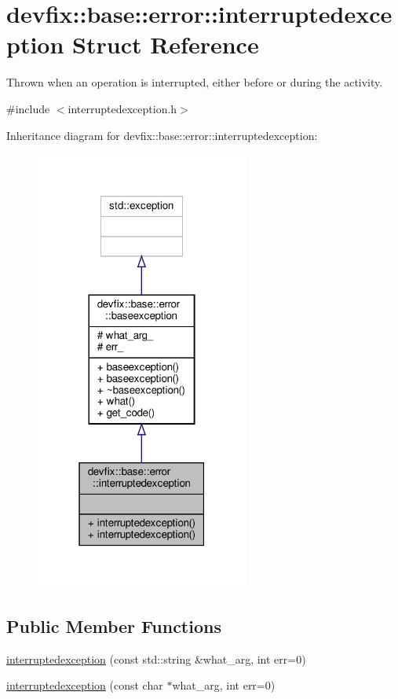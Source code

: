 \hypertarget{structdevfix_1_1base_1_1error_1_1interruptedexception}{}\section{devfix\+:\+:base\+:\+:error\+:\+:interruptedexception Struct Reference}
\label{structdevfix_1_1base_1_1error_1_1interruptedexception}


Thrown when an operation is interrupted, either before or during the activity.  




{\ttfamily \#include $<$interruptedexception.\+h$>$}



Inheritance diagram for devfix\+:\+:base\+:\+:error\+:\+:interruptedexception\+:
\nopagebreak
\begin{figure}[H]
\begin{center}
\leavevmode
\includegraphics[width=199pt]{structdevfix_1_1base_1_1error_1_1interruptedexception__inherit__graph}
\end{center}
\end{figure}
\subsection*{Public Member Functions}
\begin{DoxyCompactItemize}
\item 
\hyperlink{structdevfix_1_1base_1_1error_1_1interruptedexception_ab89281cb08ca7481da32bde8da8e7a00}{interruptedexception} (const std\+::string \&what\+\_\+arg, int err=0)
\item 
\hyperlink{structdevfix_1_1base_1_1error_1_1interruptedexception_ac84d255100c72753ea35f8e7007413c1}{interruptedexception} (const char $\ast$what\+\_\+arg, int err=0)
\end{DoxyCompactItemize}
